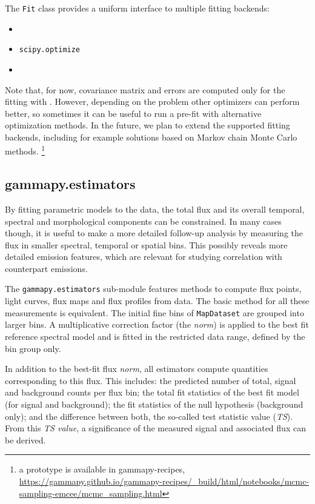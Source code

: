 \documentclass[longauth]{aa}
\newcommand{\code}[1]{\texttt{#1}}
\begin{document}
The \code{Fit} class provides a uniform interface to multiple fitting backends:
\begin{itemize}
	\setlength\itemsep{1em}
	\item \iminuit~\citep{iminuit}
	\item \code{scipy.optimize}~\citep{2020SciPy-NMeth}
	\item \sherpa~\citep{sherpa-2011, sherpa-2001}
\end{itemize}

Note that, for now, covariance matrix and errors are computed only for the fitting with 
\iminuit. However, depending on
the problem other optimizers can perform better, so sometimes it can be useful
to run a pre-fit with alternative optimization methods. In the future, we plan to
extend the supported fitting backends, including for example solutions based on Markov chain Monte Carlo methods.
\footnote{a prototype is available in gammapy-recipes,
	\url{https://gammapy.github.io/gammapy-recipes/_build/html/notebooks/mcmc-sampling-emcee/mcmc_sampling.html}
}

\subsection{gammapy.estimators}
\label{ssec:gammapy-estimators}
By fitting parametric models to the data, the total \gammaray
flux and its overall temporal, spectral and morphological components can be constrained.
In many cases though, it is useful to make a more detailed follow-up analysis by measuring the
flux in smaller spectral, temporal or spatial bins. This
possibly reveals more detailed emission features, which
are relevant for studying correlation with counterpart emissions.

The \code{gammapy.estimators} sub-module features methods to compute flux
points, light curves, flux maps and flux profiles from data.
The basic method for all these measurements is equivalent.
The initial fine bins of \code{MapDataset} are grouped into
larger bins. A multiplicative correction factor (the \textit{norm})
is applied to the best fit reference spectral
model and is fitted in the restricted data range, defined by the 
bin group only.

In addition to the best-fit flux \textit{norm}, all estimators compute
quantities corresponding to this flux. This includes:
the predicted number of total, signal and background
counts per flux bin; the total fit statistics
of the best fit model (for signal and background); the fit statistics of the
null hypothesis (background only); and the difference between both,
the so-called test statistic value (\textit{TS}).
From this \textit{TS value}, a significance of the measured signal and associated flux
can be derived.
\end{document}
